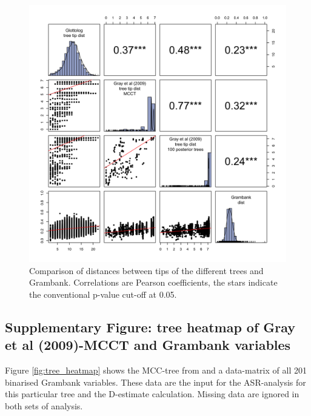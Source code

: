 \documentclass[12pt,letterpaper]{article}
\begin{document}
\begin{figure}[!ht]
\centering
\includegraphics[width=17cm]{illustrations/plots_from_R/SPLOM_tree_dists.png}
\caption{Comparison of distances between tips of the different trees and Grambank. Correlations are Pearson coefficients, the stars indicate the conventional p-value cut-off at 0.05.}
\label{tree_dist_splom}
\end{figure}

\FloatBarrier
\newpage
\subsection{Supplementary Figure: tree heatmap of Gray et al (2009)-MCCT and Grambank variables}
\label{supp:fig_tree_heatmap}

Figure \ref{fig:tree_heatmap} shows the MCC-tree from \citet{grayetal_2009} and a data-matrix of all 201 binarised Grambank variables. These data are the input for the ASR-analysis for this particular tree and the D-estimate calculation. Missing data are ignored in both sets of analysis.
\end{document}
